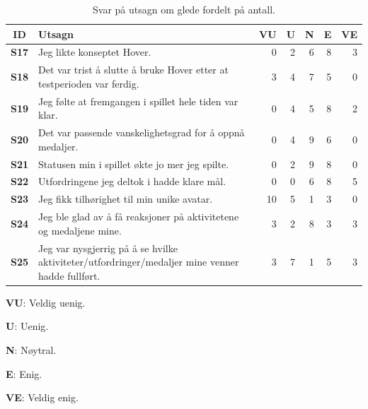 \begin{table}[H]     \small
   
    \begin{threeparttable}[t]
    \begin{tabularx}{\textwidth}{|>{\bfseries}c|X|r|r|r|r|r|}
        \hline  \textbf{ID} &  \textbf{Utsagn} & \textbf{VU }  &  \textbf{U}  &  \textbf{N}  &  \textbf{E}  &  \textbf{VE}  \\ \hline
        S17 & Jeg likte konseptet Hover.  & 0 & 2 & 6 & 8 & 3 \\ 
        S18 & Det var trist å slutte å bruke Hover etter at testperioden var ferdig.  & 3 & 4 & 7 & 5 & 0 \\ 
        S19 & Jeg følte at fremgangen i spillet hele tiden var klar.  & 0 & 4 & 5 & 8 & 2 \\ 
        S20 & Det var passende vanskelighetsgrad for å oppnå medaljer.  & 0 & 4 & 9 & 6 & 0 \\ 
        S21 & Statusen min i spillet økte jo mer jeg spilte.  & 0 & 2 & 9 & 8 & 0 \\ 
        S22 & Utfordringene jeg deltok i hadde klare mål.  & 0 & 0 & 6 & 8 & 5 \\ 
        S23 & Jeg fikk tilhørighet til min unike avatar.  & 10 & 5 & 1 & 3 & 0 \\ 
        S24 & Jeg ble glad av å få reaksjoner på aktivitetene og medaljene mine.  & 3 & 2 & 8 & 3 & 3 \\ 
        S25 & Jeg var nysgjerrig på å se hvilke aktiviteter/utfordringer/medaljer mine venner hadde fullført.  & 3 & 7 & 1 & 5 & 3 \\
         \hline
    \end{tabularx}
    \begin{tablenotes}
    \scriptsize
     \item[] \textbf{VU}: Veldig uenig.
     \item[] \textbf{U}: Uenig.
     \item[] \textbf{N}: Nøytral.
     \item[] \textbf{E}: Enig.
     \item[] \textbf{VE}: Veldig enig.
   \end{tablenotes}
   \end{threeparttable}
   \caption{Svar på utsagn om glede fordelt på antall.}
\end{table}


